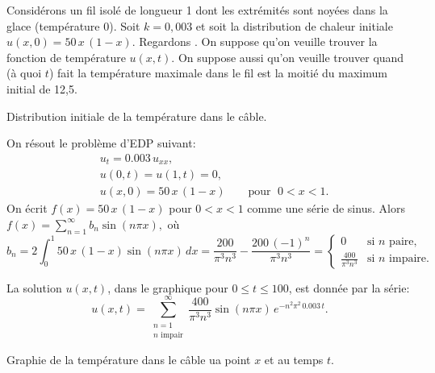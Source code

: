 \begin{example}

Considérons un fil isolé de longueur 1 dont
les extrémités sont noyées dans la glace (température 0).
Soit $ k = 0,003 $ et soit la distribution de chaleur initiale $ u (x, 0) = 50 \, x \, (1-x) $.
Regardons  .
On suppose qu'on veuille trouver la fonction de température $ u (x, t) $.  On suppose aussi qu'on veuille trouver quand (à quoi $ t $) fait la température maximale dans le fil
est la moitié du maximum initial de 12,5.

\begin{myfig}
\capstart
{}
\caption{Distribution initiale de la température dans le
câble.\label{heat:wireexinitfig}}
\end{myfig}

On résout le problème d'EDP suivant: 
\begin{align*}
& u_t = 0.003 \, u_{xx} , \\
& u(0,t) = u(1,t) = 0 , \\
& u(x,0) = 50\,x\,(1-x) \qquad \text{pour } \; 0 < x < 1 .
\end{align*}
On écrit $f(x) = 50\,x\,(1-x)$ pour $0 < x < 1$ comme une série de sinus.  Alors 
$
f(x) = \sum_{n=1}^\infty b_n \sin (n \pi x) ,
$
où
\begin{equation*}
b_n = 2 \int_0^1 50\,x\,(1-x) \sin (n \pi x) \,dx
= 
\frac{200}{{\pi }^{3}{n}^{3}}-\frac{200\,{\left( -1\right) }^{n}}{{\pi }^{3}{n}^{3}}
=
\begin{cases}
0 & \text{si } n \text{ paire} , \\
\frac{400}{\pi^3 n^3} & \text{si } n \text{ impaire} .
\end{cases}
\end{equation*}

La solution $u(x,t)$,  dans le graphique
 pour $0 \leq t \leq 100$,
est donnée par la série:
\begin{equation*}
u(x,t) = 
\sum_{\substack{n=1 \\ n \text{ impair}}}^\infty
\frac{400}{\pi^3 n^3}
\sin (n \pi x )
\, e^{-n^2 \pi^2 \, 0.003 \, t} .
\end{equation*}

\begin{myfig}
\capstart
{}
\caption{Graphie de la température dans le câble ua point $x$
et au temps $t$.\label{heat:wireexfig}}
\end{myfig}


\end{example}
